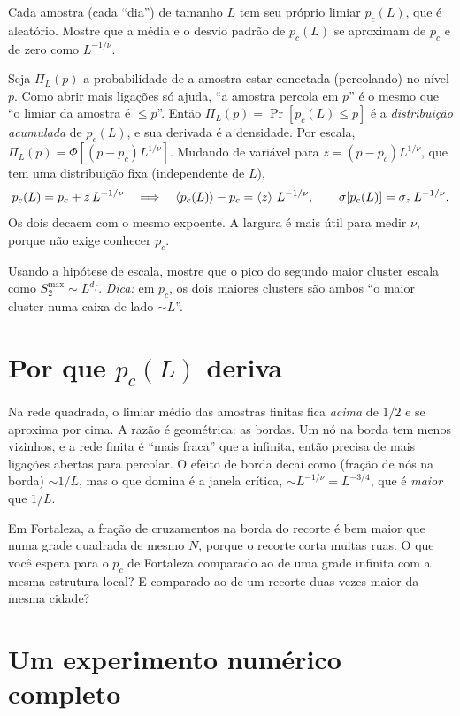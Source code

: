 \documentclass[11pt]{article}
\begin{document}
\begin{exemplo}
Cada amostra (cada ``dia'') de tamanho $L$ tem seu próprio limiar $p_c(L)$, que é aleatório. Mostre que a média e o desvio padrão de $p_c(L)$ se aproximam de $p_c$ e de zero como $L^{-1/\nu}$.
\end{exemplo}
\begin{solucao}
Seja $\Pi_L(p)$ a probabilidade de a amostra estar conectada (percolando) no nível $p$. Como abrir mais ligações só ajuda, ``a amostra percola em $p$'' é o mesmo que ``o limiar da amostra é $\le p$''. Então $\Pi_L(p) = \Pr[p_c(L)\le p]$ é a \emph{distribuição acumulada} de $p_c(L)$, e sua derivada é a densidade. Por escala, $\Pi_L(p) = \Phi[(p-p_c)L^{1/\nu}]$. Mudando de variável para $z = (p-p_c)L^{1/\nu}$, que tem uma distribuição fixa (independente de $L$),
\[
p_c(L) = p_c + z\,L^{-1/\nu}\quad\Longrightarrow\quad \left\langle p_c(L) \right\rangle-p_c = \left\langle z \right\rangle\,L^{-1/\nu},\qquad \sigma[p_c(L)] = \sigma_z\,L^{-1/\nu}.
\]
Os dois decaem com o mesmo expoente. A largura é mais útil para medir $\nu$, porque não exige conhecer $p_c$.
\end{solucao}

 Usando a hipótese de escala, mostre que o pico do segundo maior cluster escala como $S_2^{\max}\sim L^{d_f}$. \emph{Dica:} em $p_c$, os dois maiores clusters são ambos ``o maior cluster numa caixa de lado $\sim L$''.

\section{Por que $p_c(L)$ deriva}

Na rede quadrada, o limiar médio das amostras finitas fica \emph{acima} de $1/2$ e se aproxima por cima. A razão é geométrica: as bordas. Um nó na borda tem menos vizinhos, e a rede finita é ``mais fraca'' que a infinita, então precisa de mais ligações abertas para percolar. O efeito de borda decai como (fração de nós na borda) $\sim1/L$, mas o que domina é a janela crítica, $\sim L^{-1/\nu} = L^{-3/4}$, que é \emph{maior} que $1/L$.

 Em Fortaleza, a fração de cruzamentos na borda do recorte é bem maior que numa grade quadrada de mesmo $N$, porque o recorte corta muitas ruas. O que você espera para o $p_c$ de Fortaleza comparado ao de uma grade infinita com a mesma estrutura local? E comparado ao de um recorte duas vezes maior da mesma cidade?

\section{Um experimento numérico completo}
\end{document}
